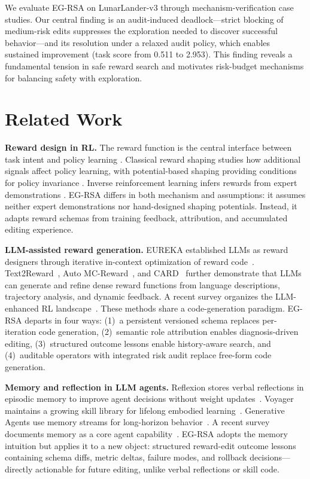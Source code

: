 \documentclass[11pt]{article}
\begin{document}
We evaluate EG-RSA on LunarLander-v3 through mechanism-verification case studies. Our central finding is an audit-induced deadlock---strict blocking of medium-risk edits suppresses the exploration needed to discover successful behavior---and its resolution under a relaxed audit policy, which enables sustained improvement (task score from 0.511 to 2.953). This finding reveals a fundamental tension in safe reward search and motivates risk-budget mechanisms for balancing safety with exploration.

\section{Related Work}
\label{sec:related}

\textbf{Reward design in RL.} The reward function is the central interface between task intent and policy learning \citep{sutton2018reinforcement}. Classical reward shaping studies how additional signals affect policy learning, with potential-based shaping providing conditions for policy invariance \citep{ng1999policy}. Inverse reinforcement learning infers rewards from expert demonstrations \citep{ng2000irl,abbeel2004apprenticeship}. EG-RSA differs in both mechanism and assumptions: it assumes neither expert demonstrations nor hand-designed shaping potentials. Instead, it adapts reward schemas from training feedback, attribution, and accumulated editing experience.

\textbf{LLM-assisted reward generation.} EUREKA established LLMs as reward designers through iterative in-context optimization of reward code~\citep{ma2023eureka}. Text2Reward~\citep{xie2023text2reward}, Auto MC-Reward~\citep{li2023automcreward}, and CARD~\citep{sun2024card} further demonstrate that LLMs can generate and refine dense reward functions from language descriptions, trajectory analysis, and dynamic feedback. A recent survey organizes the LLM-enhanced RL landscape~\citep{cao2024survey}. These methods share a code-generation paradigm. EG-RSA departs in four ways: (1)~a persistent versioned schema replaces per-iteration code generation, (2)~semantic role attribution enables diagnosis-driven editing, (3)~structured outcome lessons enable history-aware search, and (4)~auditable operators with integrated risk audit replace free-form code generation.

\textbf{Memory and reflection in LLM agents.} Reflexion stores verbal reflections in episodic memory to improve agent decisions without weight updates~\citep{shinn2023reflexion}. Voyager maintains a growing skill library for lifelong embodied learning~\citep{wang2023voyager}. Generative Agents use memory streams for long-horizon behavior~\citep{park2023generative}. A recent survey documents memory as a core agent capability~\citep{zhang2024memorysurvey}. EG-RSA adopts the memory intuition but applies it to a new object: structured reward-edit outcome lessons containing schema diffs, metric deltas, failure modes, and rollback decisions---directly actionable for future editing, unlike verbal reflections or skill code.
\end{document}
